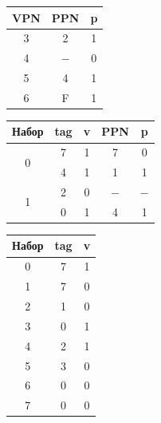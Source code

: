 \documentclass[12pt, letterpaper]{article}
\begin{document}
\begin{minipage}{.2\textwidth}
    \begin{tabular}{|c|c|c|}
        \hline
        VPN & PPN & p\\
        \hline
        3 & 2 & 1\\
        \hline
        4 & $-$ & 0\\
        \hline
        5 & 4 & 1\\
        \hline
        6 & F & 1\\
        \hline
    \end{tabular}
\end{minipage} 
\hspace{1cm}
\begin{minipage}{.2\textwidth}
    \begin{tabular}{|c|c|c|c|c|}
        \hline
        Набор & tag & v & PPN & p\\
        \hline
        \multirow{2}{.2\textwidth}{0} & 7 & 1 & 7 & 0\\
        \cline{2-5}
        & 4 & 1 & 1 & 1\\
        \hline
        \multirow{2}{.2\textwidth}{1} & 2 & 0 & $-$ & $-$\\
        \cline{2-5}
        & 0 & 1 & 4 & 1\\
        \hline
    \end{tabular}
\end{minipage} 
\hspace{3cm}
\begin{minipage}{.2\textwidth}
    \begin{tabular}{|c|c|c|}
        \hline
        Набор & tag & v\\
        \hline
        0 & 7 & 1\\
        \hline
        1 & 7 & 0\\
        \hline
        2 & 1 & 0\\
        \hline
        3 & 0 & 1\\
        \hline
        4 & 2 & 1\\
        \hline
        5 & 3 & 0\\
        \hline
        6 & 0 & 0\\
        \hline
        7 & 0 & 0\\
        \hline
    \end{tabular}
\end{minipage}
\newline
\end{document}
